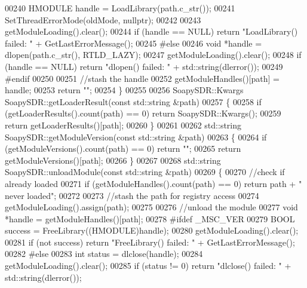 \begin{DoxyCode}
{00240     HMODULE handle = LoadLibrary(path.c\_str());
00241     SetThreadErrorMode(oldMode, \textcolor{keyword}{nullptr});
00242 
00243     getModuleLoading().clear();
00244     \textcolor{keywordflow}{if} (handle == NULL) \textcolor{keywordflow}{return} \textcolor{stringliteral}{"LoadLibrary() failed: "} + GetLastErrorMessage();
00245 \textcolor{preprocessor}{#else}
00246     \textcolor{keywordtype}{void} *handle = dlopen(path.c\_str(), RTLD\_LAZY);
00247     getModuleLoading().clear();
00248     \textcolor{keywordflow}{if} (handle == NULL) \textcolor{keywordflow}{return} \textcolor{stringliteral}{"dlopen() failed: "} + std::string(dlerror());
00249 \textcolor{preprocessor}{#endif}
00250 
00251     \textcolor{comment}{//stash the handle}
00252     getModuleHandles()[path] = handle;
00253     \textcolor{keywordflow}{return} \textcolor{stringliteral}{""};
00254 \}
00255 
00256 SoapySDR::Kwargs SoapySDR::getLoaderResult(\textcolor{keyword}{const} std::string &path)
00257 \{
00258     \textcolor{keywordflow}{if} (getLoaderResults().count(path) == 0) \textcolor{keywordflow}{return} SoapySDR::Kwargs();
00259     \textcolor{keywordflow}{return} getLoaderResults()[path];
00260 \}
00261 
00262 std::string SoapySDR::getModuleVersion(\textcolor{keyword}{const} std::string &path)
00263 \{
00264     \textcolor{keywordflow}{if} (getModuleVersions().count(path) == 0) \textcolor{keywordflow}{return} \textcolor{stringliteral}{""};
00265     \textcolor{keywordflow}{return} getModuleVersions()[path];
00266 \}
00267 
00268 std::string SoapySDR::unloadModule(\textcolor{keyword}{const} std::string &path)
00269 \{
00270     \textcolor{comment}{//check if already loaded}
00271     \textcolor{keywordflow}{if} (getModuleHandles().count(path) == 0) \textcolor{keywordflow}{return} path + \textcolor{stringliteral}{" never loaded"};
00272 
00273     \textcolor{comment}{//stash the path for registry access}
00274     getModuleLoading().assign(path);
00275 
00276     \textcolor{comment}{//unload the module}
00277     \textcolor{keywordtype}{void} *handle = getModuleHandles()[path];
00278 \textcolor{preprocessor}{#ifdef \_MSC\_VER}
00279     BOOL success = FreeLibrary((HMODULE)handle);
00280     getModuleLoading().clear();
00281     \textcolor{keywordflow}{if} (not success) \textcolor{keywordflow}{return} \textcolor{stringliteral}{"FreeLibrary() failed: "} + GetLastErrorMessage();
00282 \textcolor{preprocessor}{#else}
00283     \textcolor{keywordtype}{int} status = dlclose(handle);
00284     getModuleLoading().clear();
00285     \textcolor{keywordflow}{if} (status != 0) \textcolor{keywordflow}{return} \textcolor{stringliteral}{"dlclose() failed: "} + std::string(dlerror());
}
\end{DoxyCode}
